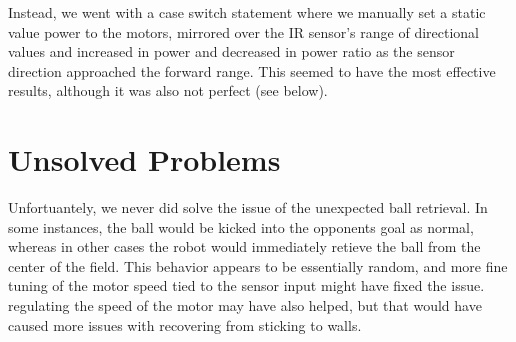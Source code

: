 \documentclass[journal]{../IEEEtran}
\begin{document}
Instead, we went with a case switch statement where we manually set a static value power to the motors, mirrored over the IR sensor's range of directional values and increased in power and decreased in power ratio as the sensor direction approached the forward range. This seemed to have the most effective results, although it was also not perfect (see below).

\section{Unsolved Problems}\label{S.unsolved}

Unfortuantely, we never did solve the issue of the unexpected ball retrieval. In some instances, the ball would be kicked into the opponents goal as normal, whereas in other cases the robot would immediately retieve the ball from the center of the field. This behavior appears to be essentially random, and more fine tuning of the motor speed tied to the sensor input might have fixed the issue. regulating the speed of the motor may have also helped, but that would have caused more issues with recovering from sticking to walls.
\end{document}
